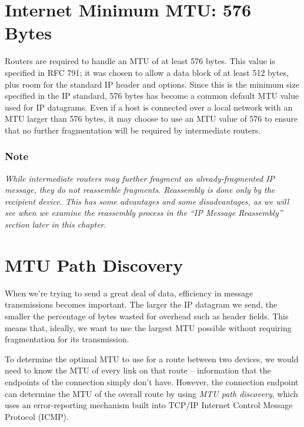\section{Internet Minimum MTU: 576 Bytes}

\protect\hypertarget{ch22.htmlux5cux23idx-CHP-22-0803}{}{}Routers are
required to handle an MTU of at least 576 bytes. This value is specified
in RFC 791; it was chosen to allow a data block of at least 512 bytes,
plus room for the standard IP header and options. Since this is the
minimum size specified in the IP standard, 576 bytes has become a common
default MTU value used for IP datagrams. Even if a host is connected
over a local network with an MTU larger than 576 bytes, it may choose to
use an MTU value of 576 to ensure that no further fragmentation will be
required by intermediate routers.

\subsubsection[Note]{\texorpdfstring{\protect\hypertarget{ch22.htmlux5cux23note-82}{}{}Note}{Note}}

{\emph{While intermediate routers may further fragment an
already-fragmented IP message, they do not reassemble fragments.
Reassembly is done only by the recipient device. This has some
advantages and some disadvantages, as we will see when we examine the
reassembly process in the ``IP Message Reassembly'' section later in this
chapter}}.



\section{MTU Path Discovery}

\protect\hypertarget{ch22.htmlux5cux23idx-CHP-22-0804}{}{}When we're
trying to send a great deal of data, efficiency in message transmissions
becomes important. The larger the IP datagram we send, the smaller the
percentage of bytes wasted for overhead such as header fields. This
means that, ideally, we want to use the largest MTU possible without
requiring fragmentation for its transmission.

To determine the optimal MTU to use for a route between two devices, we
would need to know the MTU of every link on that route -- information
that the endpoints of the connection simply don't have. However, the
connection endpoint can determine the MTU of the overall route by using
{\emph{MTU path discovery}}, which uses an error-reporting mechanism
built into TCP/IP
\protect\hypertarget{ch22.htmlux5cux23idx-CHP-22-0805}{}{}Internet
Control Message Protocol (ICMP).

